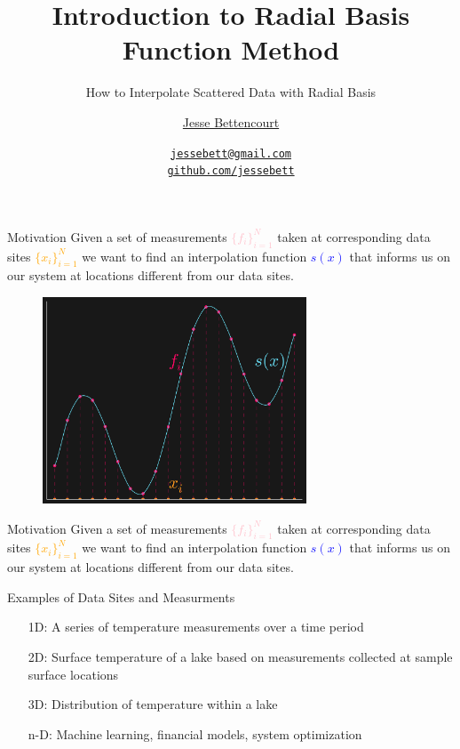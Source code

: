 \documentclass[12pt,t]{beamer}
\title{Introduction to Radial Basis Function Method}
\subtitle{How to Interpolate Scattered Data with Radial Basis}
\author{\href{https://github.com/jessebett/}{Jesse Bettencourt}}
\institute{McMaster University\\Dr. Kevlahan}
\date{\href{jessebett@gmail.com}{\tt \scriptsize jessebett@gmail.com}
\\[-4pt]
\href{http://github.com/jessebett}{\tt \scriptsize github.com/jessebett}
}
\newcommand{\subt}[1]{{\footnotesize \color{subtitle} {#1}}}
\begin{document}
\begin{frame}
  \titlepage
  \note{}
\end{frame}

\begin{frame}{Motivation}
Given a set of measurements \textcolor{pink}{$\{f_i\}_{i=1}^N$}
taken at corresponding data sites \textcolor{orange}{$\{x_i\}_{i=1}^N$}
we want to find an interpolation function \textcolor{blue}{$s(x)$}
that informs us on our system at locations different from our data sites.\\
\bigskip 

\begin{figure}
\includegraphics[width=0.7\textwidth, keepaspectratio]{fig1.png}
\end{figure}

\note{}
\end{frame}
\begin{frame}{Motivation}
Given a set of measurements \textcolor{pink}{$\{f_i\}_{i=1}^N$}
taken at corresponding data sites \textcolor{orange}{$\{x_i\}_{i=1}^N$}
we want to find an interpolation function \textcolor{blue}{$s(x)$}
that informs us on our system at locations different from our data sites.\\
\bigskip 

\subt{Examples of Data Sites and Measurments}
\begin{itemize}
\item[1D:] A series of temperature measurements over a time period
\item[2D:] Surface temperature of a lake based on measurements collected at sample surface locations 
\item[3D:] Distribution of temperature within a lake
\item[n-D:] Machine learning, financial models, system optimization
\end{itemize}

\note{}
\end{frame}
\end{document}
